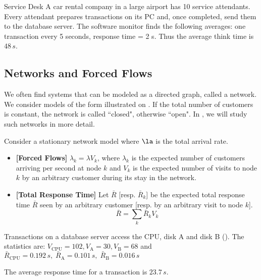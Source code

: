 \begin{ex}{Service Desk} A car rental company in a large airport has 10
service attendants. Every attendant prepares
transactions on its PC and, once completed, send
them to the database server. The software monitor
finds the following averages: one transaction
every 5 seconds, response time = 2 s. Thus the
average think time is $48\,s$.
\end{ex}
\subsection{Networks and Forced Flows}
  We often
find systems that can be modeled as a directed graph, called a
network. We consider models of the form illustrated on
.  If the total number of customers is
constant, the network is called ``closed", otherwise ``open".
In , we will study such networks in more detail.
\begin{figure}[!htbp]
\end{figure}

\begin{shadethm}
 Consider a stationary
network model where $\la$ is the total arrival
rate.
\begin{itemize}
  \item \textbf{[Forced Flows]}
  $\lambda_k=\lambda V_k$, where $\lambda_k$ is the expected number of customers arriving per
  second at node $k$ and $V_k$ is the expected number of
  visits to node $k$ by an arbitrary customer during its stay in the
  network.
  \item \textbf{[Total Response Time]} Let $\bar{R}$ [resp. $\bar{R}_k$] be the expected total response time $\bar{R}$
   seen by an arbitrary customer [resp. by an arbitrary visit to node $k$].
   $$
   \bar{R}=\sum_k \bar{R}_k V_k
   $$
\end{itemize}\label{theo-q-ff}
\end{shadethm}
%
\begin{ex}{}Transactions on a database server access
the CPU, disk A and disk B
(). The statistics are:
$V_{\mbox{CPU}}=102, V_{\mbox{A}}=30,
V_{\mbox{B}}=68$ and
$\bar{R}_{\mbox{CPU}}=0.192\, s,
\;\bar{R}_{\mbox{A}}=0.101\, s,\;
\bar{R}_{\mbox{B}}=0.016\, s $

The average response time for a transaction is
$23.7\,s$.
\end{ex}
